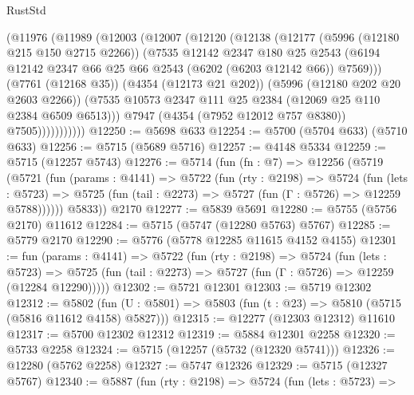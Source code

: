 \begin{lexlean}{RustStd}
\begin{coremodule}
                (@11976
                  (@11989
                    (@12003
                      (@12007
                        (@12120
                          (@12138
                            (@12177
                              (@5996 (@12180 @215 @150 @2715 @2266))
                              (@7535
                                @12142
                                @2347
                                @180
                                @25
                                @2543
                                (@6194
                                  @12142
                                  @2347
                                  @66
                                  @25
                                  @66
                                  @2543
                                  (@6202 (@6203 @12142 @66))
                                  @7569)))
                            (@7761 (@12168 @35))
                            (@4354 (@12173 @21 @202))
                            (@5996 (@12180 @202 @20 @2603 @2266))
                            (@7535 @10573 @2347 @111 @25 @2384 (@12069 @25 @110 @2384 @6509 @6513)))
                          @7947
                          (@4354 (@7952 @12012 @757 @8380))
                          @7505)))))))))))
@12250 := @5698 @633
@12254 := @5700 (@5704 @633) (@5710 @633)
@12256 := @5715 (@5689 @5716)
@12257 := @4148 @5334
@12259 := @5715 (@12257 @5743)
@12276 := @5714
    (fun (fn : @7) =>
    @12256
      (@5719
        (@5721
          (fun (params : @4141) =>
          @5722
            (fun (rty : @2198) =>
            @5724
              (fun (lets : @5723) =>
              @5725 (fun (tail : @2273) => @5727 (fun (Γ : @5726) => @12259 @5788))))))
        @5833))
    @2170
@12277 := @5839 @5691
@12280 := @5755 (@5756 @2170) @11612
@12284 := @5715 (@5747 (@12280 @5763) @5767)
@12285 := @5779 @2170
@12290 := @5776 (@5778 @12285 @11615 @4152 @4155)
@12301 := fun (params : @4141) =>
  @5722
    (fun (rty : @2198) =>
    @5724
      (fun (lets : @5723) =>
      @5725 (fun (tail : @2273) => @5727 (fun (Γ : @5726) => @12259 (@12284 @12290)))))
@12302 := @5721 @12301
@12303 := @5719 @12302
@12312 := @5802
    (fun (U : @5801) => @5803 (fun (t : @23) => @5810 (@5715 (@5816 @11612 @4158) @5827)))
@12315 := @12277 (@12303 @12312) @11610
@12317 := @5700 @12302 @12312
@12319 := @5884 @12301 @2258
@12320 := @5733 @2258
@12324 := @5715 (@12257 (@5732 (@12320 @5741)))
@12326 := @12280 (@5762 @2258)
@12327 := @5747 @12326
@12329 := @5715 (@12327 @5767)
@12340 := @5887
    (fun (rty : @2198) =>
    @5724
      (fun (lets : @5723) =>

\end{coremodule}
\end{lexlean}

